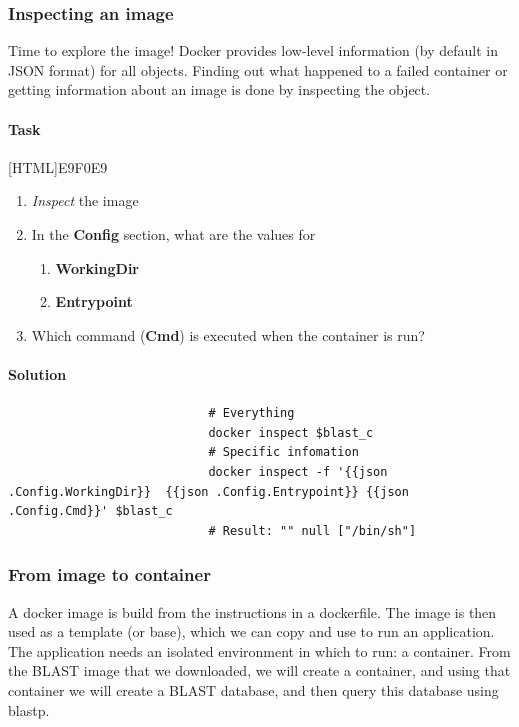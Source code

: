 \documentclass[12pt]{article}
\begin{document}
			\subsubsection{Inspecting an image}
				Time to explore the image!  
				Docker provides low-level information (by default in JSON format) for all objects.
				Finding out what happened to a failed container or getting information about an image is done by inspecting the object.
	
				\paragraph{Task}
					[HTML]{E9F0E9}{\parbox{\linewidth}{%
						\begin{enumerate}
							\item \textit{Inspect} the image
							\item In the \textbf{Config} section, what are the values for 
							 \begin{enumerate}
							 	\item \textbf{WorkingDir}
							 	\item \textbf{Entrypoint}
							\end{enumerate}
								\item Which command (\textbf{Cmd}) is executed when the container is run?
						\end{enumerate}
					}}
					
				\paragraph{Solution}	
					
					\begin{minipage}{\linewidth}
						\begin{lstlisting}
							# Everything
							docker inspect $blast_c
							# Specific infomation 
							docker inspect -f '{{json .Config.WorkingDir}} 	{{json .Config.Entrypoint}}	{{json .Config.Cmd}}' $blast_c
							# Result: "" null ["/bin/sh"]
						\end{lstlisting}
				\end{minipage}
		
			\subsubsection{From image to container}		
				A docker image is build from the instructions in a dockerfile.  			
				The image is then used as a template (or base), which we can copy and use to run an application. 
				The application needs an isolated environment in which to run: a container.
				From the BLAST image that we downloaded, we will create a container, and using that container we will create a BLAST database, and then query this database using blastp.
					
\end{document}
